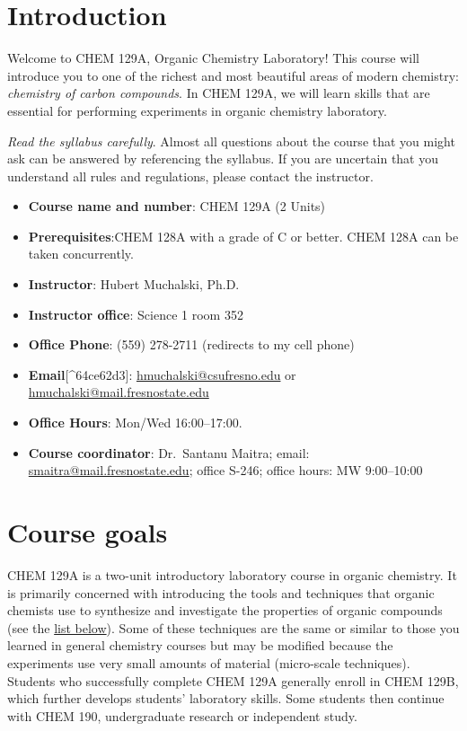 \newpage

\hypertarget{sec:introduction}{%
\section{Introduction}\label{sec:introduction}}

Welcome to CHEM 129A, Organic Chemistry Laboratory! This course will
introduce you to one of the richest and most beautiful areas of modern
chemistry: \emph{chemistry of carbon compounds}. In CHEM 129A, we will
learn skills that are essential for performing experiments in organic
chemistry laboratory.

\emph{Read the syllabus carefully}. Almost all questions about the
course that you might ask can be answered by referencing the syllabus.
If you are uncertain that you understand all rules and regulations,
please contact the instructor.

\begin{itemize}
\tightlist
\item
  \textbf{Course name and number}: CHEM 129A (2 Units)
\item
  \textbf{Prerequisites}:CHEM 128A with a grade of C or better. CHEM
  128A can be taken concurrently.
\item
  \textbf{Instructor}: Hubert Muchalski, Ph.D.
\item
  \textbf{Instructor office}: Science 1 room 352
\item
  \textbf{Office Phone}: (559) 278-2711 (redirects to my cell phone)
\item
  \textbf{Email}{[}\^{}64ce62d3{]}: \url{hmuchalski@csufresno.edu} or
  \url{hmuchalski@mail.fresnostate.edu}
\item
  \textbf{Office Hours}: Mon/Wed 16:00--17:00.
\item
  \textbf{Course coordinator}: Dr.~Santanu Maitra; email:
  \url{smaitra@mail.fresnostate.edu}; office S-246; office hours: MW
  9:00--10:00
\end{itemize}

\newpage

\hypertarget{sec:course-goals}{%
\section{Course goals}\label{sec:course-goals}}

CHEM 129A is a two-unit introductory laboratory course in organic
chemistry. It is primarily concerned with introducing the tools and
techniques that organic chemists use to synthesize and investigate the
properties of organic compounds (see the \protect\hyperlink{slo}{list
below}). Some of these techniques are the same or similar to those you
learned in general chemistry courses but may be modified because the
experiments use very small amounts of material (micro-scale techniques).
Students who successfully complete CHEM 129A generally enroll in CHEM
129B, which further develops students' laboratory skills. Some students
then continue with CHEM 190, undergraduate research or independent
study.

